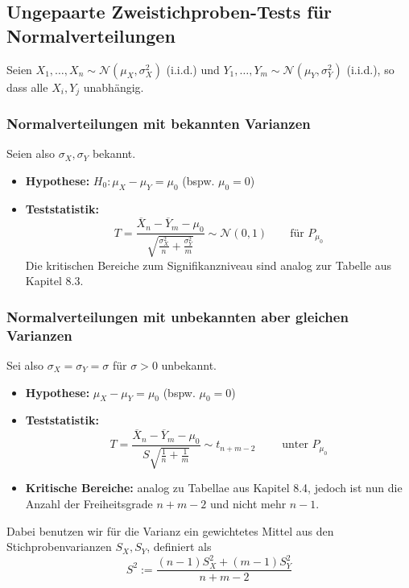 \subsection{Ungepaarte Zweistichproben-Tests für Normalverteilungen}
Seien $X_1,\dots,X_n \sim \mathcal{N}(\mu_X, \sigma_X^2) $ (i.i.d.) und $Y_1,\dots,Y_m \sim \mathcal{N}(\mu_Y, \sigma_Y^2)$ (i.i.d.), so dass alle $X_i,Y_j$ unabhängig.
\subsubsection{Normalverteilungen mit bekannten Varianzen}
Seien also $\sigma_X, \sigma_Y$ bekannt.
\begin{itemize}
\item \textbf{Hypothese:} $H_0 : \mu_X - \mu_Y = \mu_0 $ (bspw. $\mu_0 = 0$)
\item \textbf{Teststatistik:} $$ T = \frac{\overline{X}_n - \overline{Y}_m - \mu_0}{\sqrt{\frac{\sigma_X^2}{n} + \frac{\sigma_Y^2}{m}}} \sim \mathcal{N}(0,1) \quad \quad \mbox{für } P_{\mu_0}$$
Die kritischen Bereiche zum Signifikanzniveau sind analog zur Tabelle aus Kapitel 8.3.
\end{itemize}
\subsubsection{Normalverteilungen mit unbekannten aber gleichen Varianzen}
Sei also $\sigma_X = \sigma_Y = \sigma$ für $\sigma >0$ unbekannt.
\begin{itemize}
\item \textbf{Hypothese:} $\mu_X - \mu_Y = \mu_0$ (bspw. $\mu_0 = 0$)
\item \textbf{Teststatistik:} $$ T = \frac{\overline{X}_n - \overline{Y}_m - \mu_0}{S \sqrt{\frac{1}{n}+\frac{1}{m}}} \sim t_{n+m-2} \quad \quad \mbox{ unter } P_{\mu_0} $$
\item \textbf{Kritische Bereiche:} analog zu Tabellae aus Kapitel 8.4, jedoch ist nun die Anzahl der Freiheitsgrade $n+m-2$ und nicht mehr $n-1$.
\end{itemize}
Dabei benutzen wir für die Varianz ein gewichtetes Mittel aus den Stichprobenvarianzen $S_X, S_Y$, definiert als
$$ S^2 := \frac{(n-1)S_X^2 + (m-1)S_Y^2}{n+m-2}$$